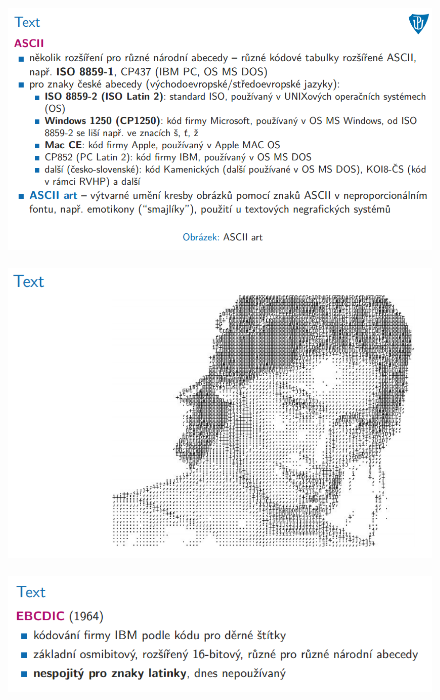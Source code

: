 \documentclass[10pt,a4paper]{article}
\begin{document}
\begin{figure} [h]
	\includegraphics[scale=0.65]{img/prvni_odstavec/otazka3/text3.png}	
\end{figure}

\begin{figure} [h]
	\includegraphics[scale=0.65]{img/prvni_odstavec/otazka3/text4.png}	
\end{figure}

\begin{figure} [h]
	\includegraphics[scale=0.65]{img/prvni_odstavec/otazka3/text5.png}	
\end{figure}
\end{document}
